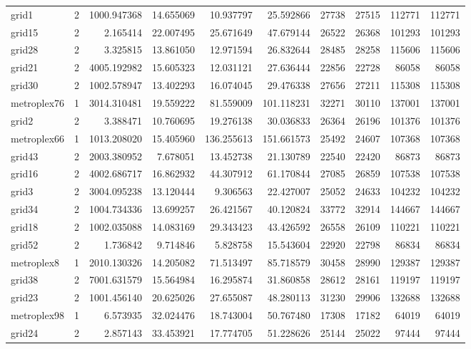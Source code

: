 \begin{longtable}{|l|r|r|r|r|r|r|r|r|r|}
grid1 & 2 & 1000.947368 & 14.655069 & 10.937797 & 25.592866 & 27738 & 27515 & 112771 & 112771 \\
grid15 & 2 & 2.165414 & 22.007495 & 25.671649 & 47.679144 & 26522 & 26368 & 101293 & 101293 \\
grid28 & 2 & 3.325815 & 13.861050 & 12.971594 & 26.832644 & 28485 & 28258 & 115606 & 115606 \\
grid21 & 2 & 4005.192982 & 15.605323 & 12.031121 & 27.636444 & 22856 & 22728 & 86058 & 86058 \\
grid30 & 2 & 1002.578947 & 13.402293 & 16.074045 & 29.476338 & 27656 & 27211 & 115308 & 115308 \\
metroplex76 & 1 & 3014.310481 & 19.559222 & 81.559009 & 101.118231 & 32271 & 30110 & 137001 & 137001 \\
grid2 & 2 & 3.388471 & 10.760695 & 19.276138 & 30.036833 & 26364 & 26196 & 101376 & 101376 \\
metroplex66 & 1 & 1013.208020 & 15.405960 & 136.255613 & 151.661573 & 25492 & 24607 & 107368 & 107368 \\
grid43 & 2 & 2003.380952 & 7.678051 & 13.452738 & 21.130789 & 22540 & 22420 & 86873 & 86873 \\
grid16 & 2 & 4002.686717 & 16.862932 & 44.307912 & 61.170844 & 27085 & 26859 & 107538 & 107538 \\
grid3 & 2 & 3004.095238 & 13.120444 & 9.306563 & 22.427007 & 25052 & 24633 & 104232 & 104232 \\
grid34 & 2 & 1004.734336 & 13.699257 & 26.421567 & 40.120824 & 33772 & 32914 & 144667 & 144667 \\
grid18 & 2 & 1002.035088 & 14.083169 & 29.343423 & 43.426592 & 26558 & 26109 & 110221 & 110221 \\
grid52 & 2 & 1.736842 & 9.714846 & 5.828758 & 15.543604 & 22920 & 22798 & 86834 & 86834 \\
metroplex8 & 1 & 2010.130326 & 14.205082 & 71.513497 & 85.718579 & 30458 & 28990 & 129387 & 129387 \\
grid38 & 2 & 7001.631579 & 15.564984 & 16.295874 & 31.860858 & 28612 & 28161 & 119197 & 119197 \\
grid23 & 2 & 1001.456140 & 20.625026 & 27.655087 & 48.280113 & 31230 & 29906 & 132688 & 132688 \\
metroplex98 & 1 & 6.573935 & 32.024476 & 18.743004 & 50.767480 & 17308 & 17182 & 64019 & 64019 \\
grid24 & 2 & 2.857143 & 33.453921 & 17.774705 & 51.228626 & 25144 & 25022 & 97444 & 97444 \\

\end{longtable}
